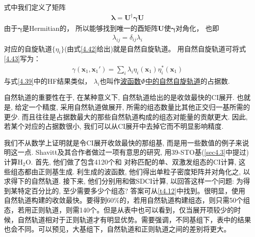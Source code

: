 式中我们定义了矩阵
\begin{align}
\bm{\lambda} = \mathbf{U^\dagger}\bm{\gamma}\mathbf{U}
\end{align}
由于$\bm{\gamma}$是Hermitian的，
所以能够找到唯一的酉矩阵$\mathbf{U}$使$\bm{\gamma}$对角化，
也即
\begin{align}
\lambda_{ij} = \delta_{ij}\lambda_i
\end{align}
对应的自旋轨道$\{\eta_i\}$(由式\eqref{4.42}给出)就是自然自旋轨道。
用自然自旋轨道可将式\eqref{4.43}写为：
\begin{align}
\gamma(\mathbf{x}_1,\mathbf{x}_1') = \sum_i \lambda_i \eta_i(\mathbf{x}_1) \eta_i^*(\mathbf{x}_1)
\end{align}
与式\eqref{4.39}中的HF结果类似，
$\lambda_i$也叫作\underline{\underline{波函数$\Phi$}中的\underline{自然自旋轨道}}的占据数.


自然轨道的重要性在于, 
在某种意义下, 
自然轨道给出的是收敛最快的CI展开. 
也就是, 
给定一个精度, 
采用自然轨道做展开, 
所需的组态数量比其他正交归一基所需的更少. 
而且往往是占据数最大的那些自然轨道构成的组态对能量的贡献更大. 
因此, 
若某个对应的占据数很小, 
我们可以从CI展开中去掉它而不明显影响精度.


我们不从数学上证明就是令CI展开收敛最快的那组基, 
而是用一些数值的例子来说明这一点. 
Shavitt及其合作者做过一项有意思的研究, 
用39-STO基(\ref{sec4.3}中提过)计算$\mathrm{H_2O}$. 
首先, 
他们做了包含4120个和\mci
{对称匹配}的单、双激发组态的CI计算, 这些组态都由正则\hft 基生成. 利生成的波函数, 他们得出单粒子密度矩阵并对角化之, 以求得下的自然轨道. 接下来, 他们分别用和做SDCI计算, 以回答这样一个问题: 为得到某特定百分比的, 至少需要多少个组态? 答案可从\ref{t4.12}中找到。很明显，使用自然轨道构建的收敛最快。要得到60\%的，若用自然轨道构建组态，则只需50个组态，若用正则轨道，则需140个。但是从表中也可以看到，仅当展开项较少的时候，自然轨道相对于正则轨道才有明显优势。需要强调，不同基组下，表中的结果也会不同。可以预见，大基组下，自然轨道和正则轨道之间的差别将更大。

